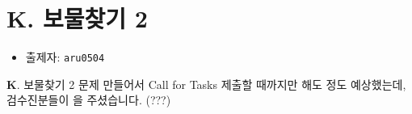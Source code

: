 \section{K. 보물찾기 2}

\begin{frame} %
    \begin{itemize}
        \item 출제자: \texttt{aru0504}
    \end{itemize}
\end{frame}

\begin{frame}{\textbf{K}. 보물찾기 2}
    문제 만들어서 Call for Tasks 제출할 때까지만 해도 정도 예상했는데, 검수진분들이 을 주셨습니다. (???)
\end{frame}
